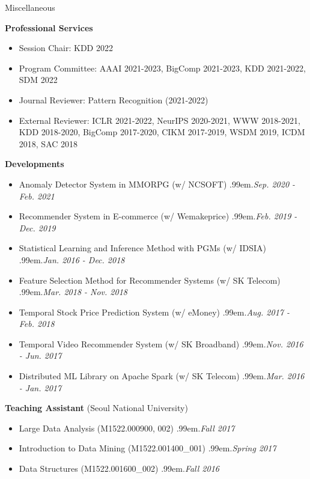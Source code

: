 \documentclass{resume} %
\makeatletter
\newcommand \Dotfill {\leavevmode \cleaders \hb@xt@ .99em{\hss .\hss }\hfill \kern \z@}
\makeatother
\begin{document}
\begin{rSection}{Miscellaneous}

\textbf{Professional Services}
\begin{itemize}[noitemsep]
	\item Session Chair: KDD 2022 \smallskip
	\item Program Committee: AAAI 2021-2023, BigComp 2021-2023, KDD 2021-2022, SDM 2022 \smallskip
	\item Journal Reviewer: Pattern Recognition  (2021-2022) \smallskip
	\item External Reviewer: ICLR 2021-2022, NeurIPS 2020-2021, WWW 2018-2021, KDD 2018-2020, BigComp 2017-2020, CIKM 2017-2019, WSDM 2019, ICDM 2018, SAC 2018
\end{itemize}

\textbf{Developments}
\begin{itemize}[noitemsep]
	\item Anomaly Detector System in MMORPG (w/ NCSOFT) \smallskip \Dotfill \emph{Sep. 2020 - Feb. 2021} \\ 
	\item Recommender System in E-commerce (w/ Wemakeprice) \smallskip \Dotfill \emph{Feb. 2019 - Dec. 2019} \\ 
	\item Statistical Learning and Inference Method with PGMs (w/ IDSIA) \smallskip \Dotfill \emph{Jan. 2016 - Dec. 2018} \\ 
	\item Feature Selection Method for Recommender Systems (w/ SK Telecom) \smallskip \Dotfill \emph{Mar. 2018 - Nov. 2018} \\ 
	\item Temporal Stock Price Prediction System (w/ eMoney) \smallskip \Dotfill \emph{Aug. 2017 - Feb. 2018} \\ 
	\item Temporal Video Recommender System (w/ SK Broadband) \smallskip \Dotfill \emph{Nov. 2016 - Jun. 2017} \\ 
	\item Distributed ML Library on Apache Spark (w/ SK Telecom) \smallskip \Dotfill \emph{Mar. 2016 - Jan. 2017}
\end{itemize}

\textbf{Teaching Assistant} (Seoul National University)
\begin{itemize}[noitemsep]
	\item Large Data Analysis (M1522.000900, 002) \smallskip \Dotfill \emph{Fall 2017}
	\item Introduction to Data Mining (M1522.001400\_001) \smallskip \Dotfill \emph{Spring 2017}
	\item Data Structures (M1522.001600\_002) \Dotfill \emph{Fall 2016}
\end{itemize}


\end{rSection}
\end{document}
